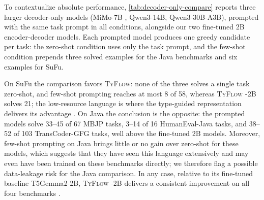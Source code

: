 \documentclass[manuscript,screen]{acmart}
\newcommand{\toolname}[1]{\textsc{#1}}
\newcommand{\mainname}{\toolname{TyFlow}\xspace}
\begin{document}
  {\color{revblue}To contextualize absolute performance, }\autoref{tab:decoder-only-compare} {\color{revblue}reports three larger decoder-only models (MiMo-7B} ,  {\color{revblue}Qwen3-14B, Qwen3-30B-A3B), prompted with the same task prompt in all conditions, alongside our two fine-tuned 2B encoder-decoder models.
Each prompted model produces one greedy candidate per task: the zero-shot condition uses only the task prompt, and the few-shot condition prepends three solved examples for the Java benchmarks and six examples for SuFu.
}

{\color{revblue}On SuFu the comparison favors }\mainname{}{\color{revblue}: none of the three solves a single task zero-shot, and few-shot prompting reaches at most 8 of 58, whereas } \mainname %
 -2B    {\color{revblue}solves 21; the low-resource language is where the type-guided representation delivers its advantage} .
On Java    {\color{revblue}the conclusion is the opposite: the prompted models solve 33--45 of 67 MBJP tasks, 3--14 of 16 HumanEval-Java tasks, and 38--52 of 103 TransCoder-GFG tasks, well above the fine-tuned 2B models. Moreover, few-shot prompting on Java brings little or no gain over zero-shot for these models, which suggests that they have seen this language extensively and may even have been trained on these benchmarks directly; we therefore flag a possible data-leakage risk for the Java comparison.
In any case, relative to its fine-tuned baseline T5Gemma2-2B, } \mainname %
 -2B    {\color{revblue}delivers a consistent improvement on all four benchmarks} .
\end{document}
